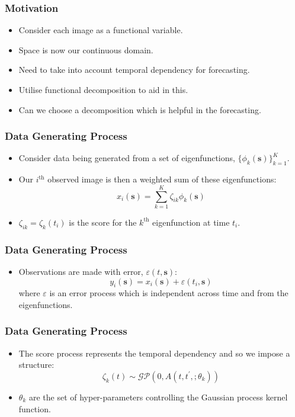 \documentclass[aspectratio=169]{beamer}
\newcommand{\ve}[1]{\bm{{#1}}}
\begin{document}
  \begin{frame}
    \frametitle{Motivation}
    \begin{itemize}
      \item Consider each image as a functional variable.
      \item Space is now our continuous domain. 
      \item Need to take into account temporal dependency for forecasting.
      \item Utilise functional decomposition to aid in this. 
      \item Can we choose a decomposition which is helpful in the forecasting. 
    \end{itemize}
  \end{frame}

  \begin{frame}
    \frametitle{Data Generating Process}
    \begin{itemize}
      \item Consider data being generated from a set of eigenfunctions, $\{\phi_k(\ve{s})\}_{k=1}^K$. 
      \item Our $i^\text{th}$ observed image is then a weighted sum of these eigenfunctions: 
        \begin{equation}
          x_i(\ve{s}) = \sum_{k=1}^K \zeta_{ik} \phi_k(\ve{s})
          \label{eqn:ef}
        \end{equation}
      \item $\zeta_{ik} = \zeta_k(t_i)$ is the score for the $k^\text{th}$ eigenfunction at time $t_i$.
    \end{itemize}
  \end{frame}

  \begin{frame}
    \frametitle{Data Generating Process}
    \begin{itemize}
      \item Observations are made with error, $\varepsilon(t, \ve{s})$:
        \begin{equation}
          y_i(\ve{s}) = x_i(\ve{s}) + \varepsilon(t_i, \ve{s})
          \label{eqn:ef_err}
        \end{equation}
        where $\varepsilon$ is an error process which is independent across time and from the eigenfunctions. 
    \end{itemize}
  \end{frame}

  \begin{frame}
    \frametitle{Data Generating Process}
    \begin{itemize}
      \item The score process represents the temporal dependency and so we impose a structure:
        \begin{equation}
          \zeta_k(t) \sim \mathcal{GP}\left( 0, A(t, t^\prime, ; \theta_k) \right)
          \label{eqnLscores}
        \end{equation}
      \item $\theta_k$ are the set of hyper-parameters controlling the Gaussian process kernel function.
    \end{itemize}
  \end{frame}
\end{document}
